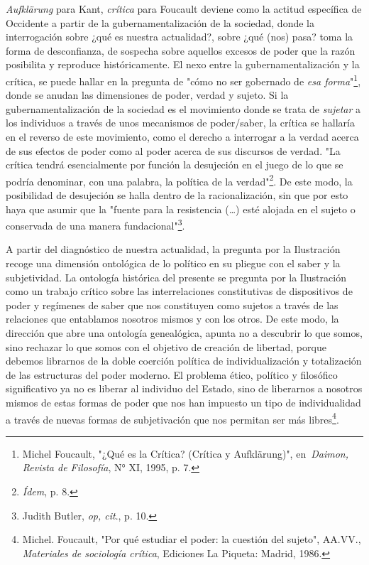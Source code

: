 \emph{Aufklärung} para Kant, \emph{crítica} para Foucault deviene como
la actitud específica de Occidente a partir de la gubernamentalización
de la sociedad, donde la interrogación sobre ¿qué es nuestra
actualidad?, sobre ¿qué (nos) pasa? toma la forma de desconfianza, de
sospecha sobre aquellos excesos de poder que la razón posibilita y
reproduce históricamente. El nexo entre la gubernamentalización y la
crítica, se puede hallar en la pregunta de "cómo no ser gobernado de
\emph{esa forma}"\footnote{Michel Foucault, "¿Qué es la Crítica?
  (Crítica y Aufklärung)", en~\emph{Daimon, Revista de Filosofía}, N°
  XI, 1995, p. 7.}, donde se anudan las dimensiones de poder, verdad y
sujeto. Si la gubernamentalización de la sociedad es el movimiento donde
se trata de \emph{sujetar} a los individuos a través de unos mecanismos
de poder/saber, la crítica se hallaría en el reverso de este movimiento,
como el derecho a interrogar a la verdad acerca de sus efectos de poder
como al poder acerca de sus discursos de verdad. "La crítica tendrá
esencialmente por función la desujeción en el juego de lo que se podría
denominar, con una palabra, la política de la verdad"\footnote{\emph{Ídem},
  p. 8.}. De este modo, la posibilidad de desujeción se halla dentro de
la racionalización, sin que por esto haya que asumir que la "fuente para
la resistencia (\dots) esté alojada en el sujeto o conservada de
una manera fundacional"\footnote{Judith Butler, \emph{op, cit}., p. 10.}.

A partir del diagnóstico de nuestra actualidad, la pregunta por la
Ilustración recoge una dimensión ontológica de lo político en su pliegue
con el saber y la subjetividad. La ontología histórica del presente se
pregunta por la Ilustración como un trabajo crítico sobre las
interrelaciones constitutivas de dispositivos de poder y regímenes de
saber que nos constituyen como sujetos a través de las relaciones que
entablamos nosotros mismos y con los otros. De este modo, la dirección
que abre una ontología genealógica, apunta no a descubrir lo que somos,
sino rechazar lo que somos con el objetivo de creación de libertad,
porque debemos librarnos de la doble coerción política de
individualización y totalización de las estructuras del poder moderno.
El problema ético, político y filosófico significativo ya no es liberar
al individuo del Estado, sino de liberarnos a nosotros mismos de estas
formas de poder que nos han impuesto un tipo de individualidad a través
de nuevas formas de subjetivación que nos permitan ser más
libres\footnote{Michel. Foucault, "Por qué estudiar el poder: la
  cuestión del sujeto", AA.VV., \emph{Materiales de sociología crítica},
  Ediciones La Piqueta: Madrid, 1986.}.

